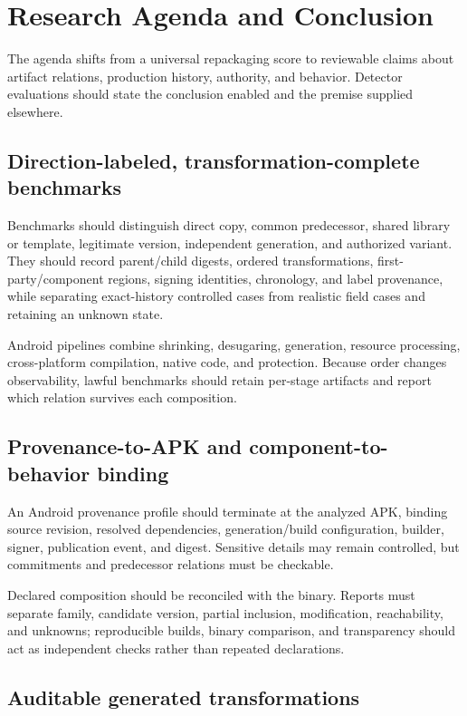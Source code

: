 \section{Research Agenda and Conclusion}
\label{sec:agenda}

The agenda shifts from a universal repackaging score to reviewable claims about artifact relations, production history, authority, and behavior. Detector evaluations should state the conclusion enabled and the premise supplied elsewhere.

\subsection{Direction-labeled, transformation-complete benchmarks}

Benchmarks should distinguish direct copy, common predecessor, shared library or template, legitimate version, independent generation, and authorized variant. They should record parent/child digests, ordered transformations, first-party/component regions, signing identities, chronology, and label provenance, while separating exact-history controlled cases from realistic field cases and retaining an unknown state.

Android pipelines combine shrinking, desugaring, generation, resource processing, cross-platform compilation, native code, and protection. Because order changes observability, lawful benchmarks should retain per-stage artifacts and report which relation survives each composition.

\subsection{Provenance-to-APK and component-to-behavior binding}

An Android provenance profile should terminate at the analyzed APK, binding source revision, resolved dependencies, generation/build configuration, builder, signer, publication event, and digest. Sensitive details may remain controlled, but commitments and predecessor relations must be checkable.

Declared composition should be reconciled with the binary. Reports must separate family, candidate version, partial inclusion, modification, reachability, and unknowns; reproducible builds, binary comparison, and transparency should act as independent checks rather than repeated declarations.

\subsection{Auditable generated transformations}

